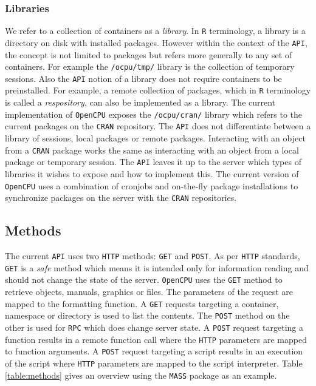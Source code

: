 \documentclass{article}
\newcommand{\GET}{\texttt{GET}\xspace}
\newcommand{\POST}{\texttt{POST}\xspace}
\newcommand{\R}{\texttt{R}\xspace}
\newcommand{\HTTP}{\texttt{HTTP}\xspace}
\newcommand{\API}{\texttt{API}\xspace}
\newcommand{\RPC}{\texttt{RPC}\xspace}
\newcommand{\OpenCPU}{\texttt{OpenCPU}\xspace}
\begin{document}
\subsubsection{Libraries}

We refer to a collection of containers as a \emph{library}. In \R terminology, a library is a directory on disk with installed packages. However within the context of the \API, the concept is not limited to packages but refers more generally to any set of containers. For example the \texttt{/ocpu/tmp/} library is the collection of temporary sessions. Also the \API notion of a library does not require containers to be preinstalled. For example, a remote collection of packages, which in \R terminology is called a \emph{respository}, can also be implemented as a library. The current implementation of \OpenCPU exposes the \texttt{/ocpu/cran/} library which refers to the current packages on the \texttt{CRAN} repository. The \API does not differentiate between a library of sessions, local packages or remote packages. Interacting with an object from a \texttt{CRAN} package works the same as interacting with an object from a local package or temporary session. The \API leaves it up to the server which types of libraries it wishes to expose and how to implement this. The current version of \OpenCPU uses a combination of cronjobs and on-the-fly package installations to synchronize packages on the server with the \texttt{CRAN} repositories.


\subsection{Methods}

The current \API uses two \HTTP methods: \GET and \POST. As per \HTTP standards, \GET is a \emph{safe} method which means it is intended only for information reading and should not change the state of the server. \OpenCPU uses the \GET method to retrieve objects, manuals, graphics or files. The parameters of the request are mapped to the formatting function. A \GET requests targeting a container, namespace or directory is used to list the contents. The \POST method on the other is used for \RPC which does change server state. A \POST request targeting a function results in a remote function call where the \HTTP parameters are mapped to function arguments. A \POST request targeting a script results in an execution of the script where \HTTP parameters are mapped to the script interpreter. Table \ref{table:methods} gives an overview using the \texttt{MASS} package \citep{MASS} as an example.
\end{document}
